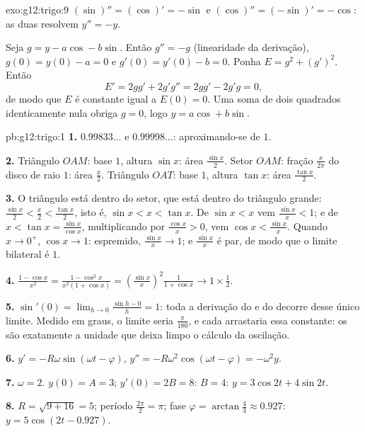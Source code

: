 \begin{solution}{exo:g12:trigo:9}
$(\sin)'' = (\cos)' = -\sin$ e $(\cos)'' = (-\sin)' = -\cos$: as duas
resolvem $y'' = -y$.

Seja $g = y - a\cos - b\sin$. Então $g'' = -g$ (linearidade da derivação),
$g(0) = y(0) - a = 0$ e $g'(0) = y'(0) - b = 0$. Ponha
$E = g^2 + (g')^2$. Então
\[
E' = 2g g' + 2g' g'' = 2g g' - 2g' g = 0,
\]
de modo que $E$ é constante igual a $E(0) = 0$. Uma soma de dois
quadrados identicamente nula obriga $g = 0$, logo
$y = a\cos + b\sin$.
\end{solution}

\begin{solution}{pb:g12:trigo:1}
\textbf{1.} $0.99833\ldots$ e $0.99998\ldots$: aproximando-se de
$1$.

\textbf{2.} Triângulo $OAM$: base $1$, altura $\sin x$: área
$\frac{\sin x}{2}$. Setor $OAM$: fração $\frac{x}{2\pi}$ do
disco de raio $1$: área $\frac x2$. Triângulo $OAT$: base $1$,
altura $\tan x$: área $\frac{\tan x}{2}$.

\textbf{3.} O triângulo está dentro do setor, que está dentro do
triângulo grande:
$\frac{\sin x}{2} < \frac x2 < \frac{\tan x}{2}$, isto é,
$\sin x < x < \tan x$. De $\sin x < x$ vem
$\frac{\sin x}{x} < 1$; e de
$x < \tan x = \frac{\sin x}{\cos x}$, multiplicando por
$\frac{\cos x}{x} > 0$, vem $\cos x < \frac{\sin x}{x}$. Quando
$x \to 0^+$, $\cos x \to 1$: espremido,
$\frac{\sin x}{x} \to 1$; e $\frac{\sin x}{x}$ é par, de modo
que o limite bilateral é $1$.

\textbf{4.} $\frac{1 - \cos x}{x^2} =
\frac{1 - \cos^2 x}{x^2 (1 + \cos x)} =
\left(\frac{\sin x}{x}\right)^2 \frac{1}{1 + \cos x}
\to 1 \times \frac12$.

\textbf{5.} $\sin'(0) = \lim_{h \to 0} \frac{\sin h - 0}{h} =
1$: toda a derivação do  e do  decorre desse único
limite. Medido em graus, o limite seria $\frac{\pi}{180}$, e
cada  arrastaria essa constante: os  são
exatamente a unidade que deixa limpo o cálculo da oscilação.

\textbf{6.} $y' = -R\omega\sin(\omega t - \varphi)$,
$y'' = -R\omega^2\cos(\omega t - \varphi) = -\omega^2 y$.

\textbf{7.} $\omega = 2$. $y(0) = A = 3$; $y'(0) = 2B = 8$:
$B = 4$: $y = 3\cos 2t + 4\sin 2t$.

\textbf{8.} $R = \sqrt{9 + 16} = 5$; período
$\frac{2\pi}{2} = \pi$; fase
$\varphi = \arctan\frac43 \approx 0.927$:
$y = 5\cos(2t - 0.927)$.


\end{solution}
